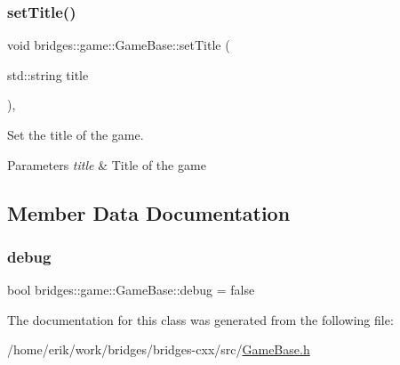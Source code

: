 \subsubsection{\texorpdfstring{set\+Title()}{setTitle()}}
{\footnotesize\ttfamily void bridges\+::game\+::\+Game\+Base\+::set\+Title (\begin{DoxyParamCaption}\item[{std\+::string}]{title }\end{DoxyParamCaption})\hspace{0.3cm}{\ttfamily [inline]}, {\ttfamily [protected]}}



Set the title of the game. 


\begin{DoxyParams}{Parameters}
{\em title} & Title of the game \\
\hline
\end{DoxyParams}


\subsection{Member Data Documentation}
\mbox{\label{classbridges_1_1game_1_1_game_base_ad2af01edd927a31613d3b881286541bb}} 
\subsubsection{\texorpdfstring{debug}{debug}}
{\footnotesize\ttfamily bool bridges\+::game\+::\+Game\+Base\+::debug = false\hspace{0.3cm}{\ttfamily [protected]}}



The documentation for this class was generated from the following file\+:\begin{DoxyCompactItemize}
\item 
/home/erik/work/bridges/bridges-\/cxx/src/\hyperlink{_game_base_8h}{Game\+Base.\+h}\end{DoxyCompactItemize}
